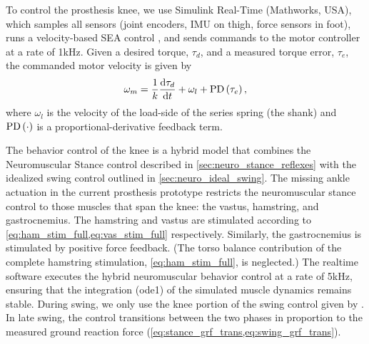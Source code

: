 To control the prosthesis knee, we use Simulink Real-Time (Mathworks, USA),
which samples all sensors (joint encoders, IMU on thigh, force sensors in foot),
runs a velocity-based SEA control \citep{schepelmann2012development}, and sends
commands to the motor controller at a rate of 1kHz. Given a desired torque,
$\tau_d$, and a measured torque error, $\tau_e$, the commanded motor velocity is
given by
\begin{align}
    \omega_m = \frac{1}{k} \frac{\tn{d} \tau_d}{\tn{d} t} + \omega_l 
        + \func{PD}{\tau_e},
\end{align}
where $\omega_l$ is the velocity of the load-side of the series spring (the
shank) and $\func{PD}{\cdot}$ is a proportional-derivative feedback term. 

The behavior control of the knee is a hybrid model that combines the
Neuromuscular Stance control described in \cref{sec:neuro_stance_reflexes} with
the idealized swing control outlined in \cref{sec:neuro_ideal_swing}. The
missing ankle actuation in the current prosthesis prototype restricts the
neuromuscular stance control to those muscles that span the knee: the vastus,
hamstring, and gastrocnemius. The hamstring and vastus are stimulated according
to \cref{eq:ham_stim_full,eq:vas_stim_full} respectively.  Similarly, the
gastrocnemius is stimulated by positive force feedback. (The torso balance
contribution of the complete hamstring stimulation, \cref{eq:ham_stim_full}, is
neglected.) The realtime software executes the hybrid neuromuscular behavior
control at a rate of 5kHz, ensuring that the integration (ode1) of the simulated
muscle dynamics remains stable. During swing, we only use the knee portion of
the swing control given by . In late swing,
the control transitions between the two phases in proportion to the measured
ground reaction force (\cref{eq:stance_grf_trans,eq:swing_grf_trans}).

